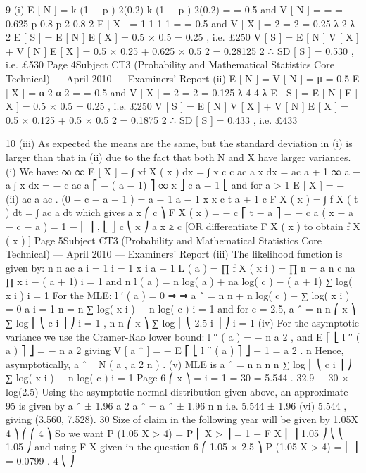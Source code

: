 9
(i)
E [ N ] = k (1 − p ) 2(0.2)
k (1 − p ) 2(0.2)
=
= 0.5 and V [ N ] =
=
= 0.625
p
0.8
p 2
0.8 2
E [ X ] = 1 1
1
1
= = 0.5 and V [ X ] = 2 = 2 = 0.25
λ 2
λ
2
E [ S ] = E [ N ] E [ X ] = 0.5 × 0.5 = 0.25 , i.e. £250
V [ S ] = E [ N ] V [ X ] + V [ N ] { E [ X ] } = 0.5 × 0.25 + 0.625 × 0.5 2 = 0.28125
2
∴ SD [ S ] = 0.530 , i.e. £530
Page 4Subject CT3 (Probability and Mathematical Statistics Core Technical) — April 2010 — Examiners’ Report
(ii)
E [ N ] = V [ N ] = μ = 0.5
E [ X ] =
α 2
α
2
= = 0.5 and V [ X ] = 2 = 2 = 0.125
λ 4
4
λ
E [ S ] = E [ N ] E [ X ] = 0.5 × 0.5 = 0.25 , i.e. £250
V [ S ] = E [ N ] V [ X ] + V [ N ] { E [ X ] } = 0.5 × 0.125 + 0.5 × 0.5 2 = 0.1875
2
∴ SD [ S ] = 0.433 , i.e. £433


\newpage

10
(iii) As expected the means are the same,
but the standard deviation in (i) is larger than that in (ii) due to the fact that
both N and X have larger variances.
(i) We have:
∞
∞
E [ X ] = ∫ xf X ( x ) dx = ∫ x
c
c
ac a
x
dx = ac
a + 1
∞
a
− a
∫ x dx = −
c
ac a ⎡ − ( a − 1) ⎤ ∞
x
⎦ c
a − 1 ⎣
and for a > 1
E [ X ] = −
(ii)
ac a
ac
.
(0 − c − a + 1 ) =
a − 1
a − 1
x x
c t a + 1
c
F X ( x ) = ∫ f X ( t ) dt = ∫
ac a
dt
which gives
a
x
⎛ c ⎞
F X ( x ) = − c ⎡ t − a ⎤ = − c a ( x − a − c − a ) = 1 − ⎜ ⎟ ,
⎣ ⎦ c
⎝ x ⎠
a
x ≥ c
[OR differentiate F X ( x ) to obtain f X ( x ) ]
Page 5Subject CT3 (Probability and Mathematical Statistics Core Technical) — April 2010 — Examiners’ Report
(iii)
The likelihood function is given by:
n n ac a
i = 1 i = 1 x i a + 1
L ( a ) = ∏ f X ( x i ) = ∏
n
= a n c na ∏ x i − ( a + 1)
i = 1
and
n
l ( a ) = n log( a ) + na log( c ) − ( a + 1) ∑ log( x i )
i = 1
For the MLE:
l ′ ( a ) = 0 ⇒
⇒ a ˆ =
n
n
+ n log( c ) − ∑ log( x i ) = 0
a
i = 1
n
=
n
∑ log( x i ) − n log( c )
i = 1
and for c = 2.5, a ˆ =
n
n
⎛ x ⎞
∑ log ⎜ ⎝ c i ⎟ ⎠
i = 1
,
n
n
⎛ x ⎞
∑ log ⎜ ⎝ 2.5 i ⎟ ⎠
i = 1
(iv)
For the asymptotic variance we use the Cramer-Rao lower bound:
l ′′ ( a ) = −
n
a
2
, and E ⎡ ⎣ l ′′ ( a ) ⎤ ⎦ = −
n
a 2
giving
{
}
V [ a ˆ ] = − E ⎡ ⎣ l ′′ ( a ) ⎤ ⎦
− 1
=
a 2
.
n
Hence, asymptotically, a ˆ ~ N ( a , a 2 n ) .
(v)
MLE is
a ˆ =
n
n
n
n
∑ log ⎜ ⎝ c i ⎟ ⎠ ∑ log( x i ) − n log( c )
i = 1
Page 6
⎛ x ⎞
=
i = 1
=
30
= 5.544 .
32.9 − 30 × log(2.5)
Using the asymptotic normal distribution given above, an approximate 95%
is given by
a ˆ ± 1.96
a 2
a ˆ
= a ˆ ± 1.96
n
n
i.e. 5.544 ± 1.96
(vi)
5.544
, giving (3.560, 7.528).
30
Size of claim in the following year will be given by 1.05X
4 ⎞
⎛
⎛ 4 ⎞
So we want P (1.05 X > 4) = P ⎜ X >
⎟ = 1 − F X ⎜
⎟
1.05 ⎠
⎝
⎝ 1.05 ⎠
and using F X given in the question
6
⎛ 1.05 × 2.5 ⎞
P (1.05 X > 4) = ⎜
⎟ = 0.0799 .
4
⎝
⎠

